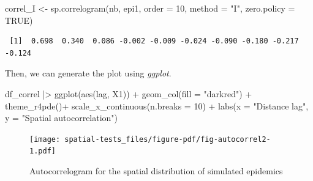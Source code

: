 \documentclass[
  letterpaper,
]{book}
\newenvironment{Shaded}{\begin{snugshade}}{\end{snugshade}}
\newcommand{\AttributeTok}[1]{\textcolor[rgb]{0.40,0.45,0.13}{#1}}
\newcommand{\CommentTok}[1]{\textcolor[rgb]{0.37,0.37,0.37}{#1}}
\newcommand{\ConstantTok}[1]{\textcolor[rgb]{0.56,0.35,0.01}{#1}}
\newcommand{\DecValTok}[1]{\textcolor[rgb]{0.68,0.00,0.00}{#1}}
\newcommand{\FunctionTok}[1]{\textcolor[rgb]{0.28,0.35,0.67}{#1}}
\newcommand{\NormalTok}[1]{\textcolor[rgb]{0.00,0.23,0.31}{#1}}
\newcommand{\OtherTok}[1]{\textcolor[rgb]{0.00,0.23,0.31}{#1}}
\newcommand{\SpecialCharTok}[1]{\textcolor[rgb]{0.37,0.37,0.37}{#1}}
\newcommand{\StringTok}[1]{\textcolor[rgb]{0.13,0.47,0.30}{#1}}
\begin{document}
\begin{Shaded}
\begin{Highlighting}[]
\NormalTok{correl\_I }\OtherTok{\textless{}{-}} \FunctionTok{sp.correlogram}\NormalTok{(nb, epi1, }
                           \AttributeTok{order =} \DecValTok{10}\NormalTok{,}
                           \AttributeTok{method =} \StringTok{"I"}\NormalTok{,  }
                           \AttributeTok{zero.policy =} \ConstantTok{TRUE}\NormalTok{)}
\end{Highlighting}
\end{Shaded}

\begin{Shaded}
\end{Shaded}

\begin{verbatim}
 [1]  0.698  0.340  0.086 -0.002 -0.009 -0.024 -0.090 -0.180 -0.217 -0.124
\end{verbatim}

Then, we can generate the plot using \emph{ggplot}.

\begin{Shaded}
\begin{Highlighting}[]
\NormalTok{df\_correl }\SpecialCharTok{|\textgreater{}}
  \FunctionTok{ggplot}\NormalTok{(}\FunctionTok{aes}\NormalTok{(lag, X1)) }\SpecialCharTok{+}
  \FunctionTok{geom\_col}\NormalTok{(}\AttributeTok{fill =} \StringTok{"darkred"}\NormalTok{) }\SpecialCharTok{+}
  \FunctionTok{theme\_r4pde}\NormalTok{()}\SpecialCharTok{+}
  \FunctionTok{scale\_x\_continuous}\NormalTok{(}\AttributeTok{n.breaks =} \DecValTok{10}\NormalTok{) }\SpecialCharTok{+}
  \FunctionTok{labs}\NormalTok{(}\AttributeTok{x =} \StringTok{"Distance lag"}\NormalTok{, }\AttributeTok{y =} \StringTok{"Spatial autocorrelation"}\NormalTok{)}
\end{Highlighting}
\end{Shaded}

\begin{figure}[H]

\texttt{[image: spatial-tests\_files/figure-pdf/fig-autocorrel2-1.pdf]} \hfill{}

\caption{\label{fig-autocorrel2}Autocorrelogram for the spatial
distribution of simulated epidemics}

\end{figure}
\end{document}
